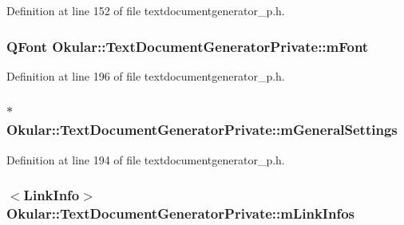 Definition at line 152 of file textdocumentgenerator\+\_\+p.\+h.

\hypertarget{classOkular_1_1TextDocumentGeneratorPrivate_a33bafae112835888fdcce49189d66b52}{
\subsubsection[{m\+Font}]{\setlength{\rightskip}{0pt plus 5cm}Q\+Font Okular\+::\+Text\+Document\+Generator\+Private\+::m\+Font}}\label{classOkular_1_1TextDocumentGeneratorPrivate_a33bafae112835888fdcce49189d66b52}


Definition at line 196 of file textdocumentgenerator\+\_\+p.\+h.

\hypertarget{classOkular_1_1TextDocumentGeneratorPrivate_a971d6bd6506cee93e6a8f0350feed03c}{
\subsubsection[{m\+General\+Settings}]{$\ast$ Okular\+::\+Text\+Document\+Generator\+Private\+::m\+General\+Settings}}\label{classOkular_1_1TextDocumentGeneratorPrivate_a971d6bd6506cee93e6a8f0350feed03c}


Definition at line 194 of file textdocumentgenerator\+\_\+p.\+h.

\hypertarget{classOkular_1_1TextDocumentGeneratorPrivate_a5378139e49bb973e98ac5a448401ff9e}{
\subsubsection[{m\+Link\+Infos}]{$<${\bf Link\+Info}$>$ Okular\+::\+Text\+Document\+Generator\+Private\+::m\+Link\+Infos}}\label{classOkular_1_1TextDocumentGeneratorPrivate_a5378139e49bb973e98ac5a448401ff9e}


